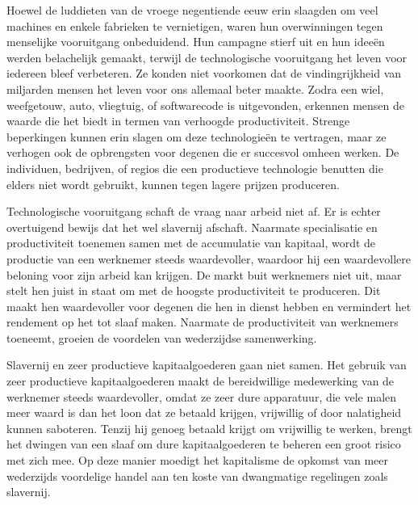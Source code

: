 Hoewel de luddieten van de vroege negentiende eeuw erin slaagden om veel machines en enkele fabrieken te vernietigen, waren hun overwinningen tegen menselijke vooruitgang onbeduidend. Hun campagne stierf uit en hun ideeën werden belachelijk gemaakt, terwijl de technologische vooruitgang het leven voor iedereen bleef verbeteren. Ze konden niet voorkomen dat de vindingrijkheid van miljarden mensen het leven voor ons allemaal beter maakte. Zodra een wiel, weefgetouw, auto, vliegtuig, of softwarecode is uitgevonden, erkennen mensen de waarde die het biedt in termen van verhoogde productiviteit. Strenge beperkingen kunnen erin slagen om deze technologieën te vertragen, maar ze verhogen ook de opbrengsten voor degenen die er succesvol omheen werken. De individuen, bedrijven, of regio\textquotesingle s die een productieve technologie benutten die elders niet wordt gebruikt, kunnen tegen lagere prijzen produceren.

Technologische vooruitgang schaft de vraag naar arbeid niet af. Er is echter overtuigend bewijs dat het wel slavernij afschaft. \autocite{73} Naarmate specialisatie en productiviteit toenemen samen met de accumulatie van kapitaal, wordt de productie van een werknemer steeds waardevoller, waardoor hij een waardevollere beloning voor zijn arbeid kan krijgen. De markt buit werknemers niet uit, maar stelt hen juist in staat om met de hoogste productiviteit te produceren. Dit maakt hen waardevoller voor degenen die hen in dienst hebben en vermindert het rendement op het tot slaaf maken. Naarmate de productiviteit van werknemers toeneemt, groeien de voordelen van wederzijdse samenwerking.

Slavernij en zeer productieve kapitaalgoederen gaan niet samen. Het gebruik van zeer productieve kapitaalgoederen maakt de bereidwillige medewerking van de werknemer steeds waardevoller, omdat ze zeer dure apparatuur, die vele malen meer waard is dan het loon dat ze betaald krijgen, vrijwillig of door nalatigheid kunnen saboteren. Tenzij hij genoeg betaald krijgt om vrijwillig te werken, brengt het dwingen van een slaaf om dure kapitaalgoederen te beheren een groot risico met zich mee. Op deze manier moedigt het kapitalisme de opkomst van meer wederzijds voordelige handel aan ten koste van dwangmatige regelingen zoals slavernij. \autocite{74}


